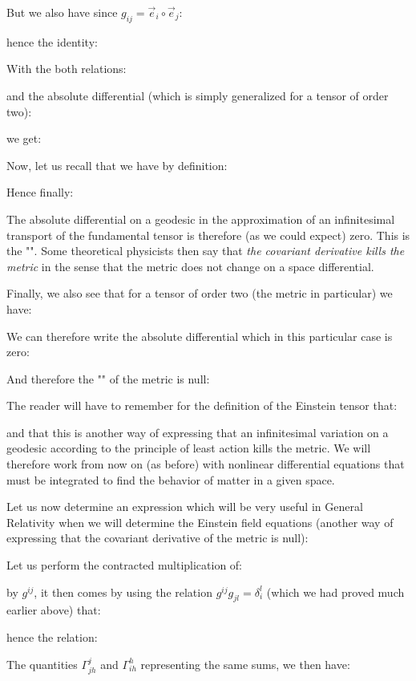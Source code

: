 	But we also have since $g_{ij}=\vec{e}_i\circ\vec{e}_j$:
	
	hence the identity:
	
	With the both relations:
	
	and the absolute differential (which is simply generalized for a tensor of order two):
	
	we get:
	
	Now, let us recall that we have by definition:
	
	Hence finally:
	
	The absolute differential on a geodesic in the approximation of an infinitesimal transport of the fundamental tensor is therefore (as we could expect) zero. This is the "". Some theoretical physicists then say that \textit{the covariant derivative kills the metric} in the sense that the metric does not change on a space differential.

	Finally, we also see that for a tensor of order two (the metric in particular) we have:
	
	We can therefore write the absolute differential which in this particular case is zero:
	
	And therefore the "" of the metric is null:
	
	\begin{tcolorbox}[title=Remark,colframe=black,arc=10pt]
	The reader will have to remember for the definition of the Einstein tensor that:
	
	and that this is another way of expressing that an infinitesimal variation on a geodesic according to the principle of least action kills the metric. We will therefore work from now on (as before) with nonlinear differential equations that must be integrated to find the behavior of matter in a given space.
	\end{tcolorbox}
	Let us now determine an expression which will be very useful in General Relativity when we will determine the Einstein field equations (another way of expressing that the covariant derivative of the metric is null):

	Let us perform the contracted multiplication of:
	
	by $g^{ij}$, it then comes by using the relation $g^{ij}g_{jl}=\delta_i^l$ (which we had proved much earlier above) that:
	
	hence the relation:
	
	The quantities $\Gamma_{jh}^j$ and $\Gamma_{ih}^h$ representing the same sums, we then have:
	
